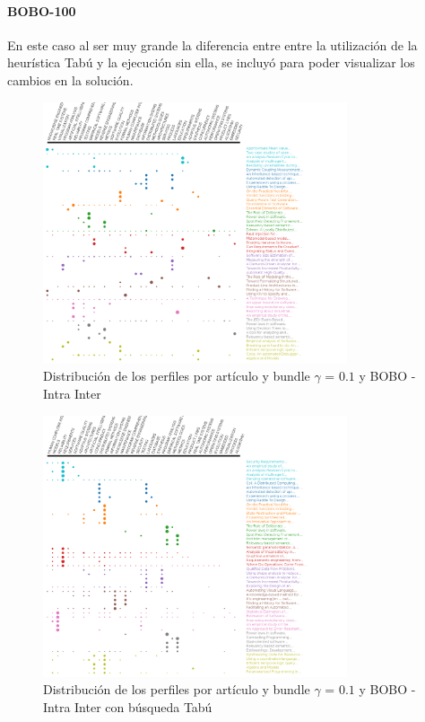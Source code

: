 \paragraph{BOBO-100}
En este caso al ser muy grande la diferencia entre entre la utilización de la heurística Tabú y la ejecución sin ella,  se incluyó para poder visualizar los cambios en la solución.
\begin{figure}[H]
  \centering
    \includegraphics[width=0.8\textwidth]{resultados/papers/BOBO/INTRA_INTER/gamma-01.png}
  \caption{Distribución de los perfiles por artículo y bundle $\gamma$ = $0.1$ y BOBO - Intra Inter}
  \label{res:img-papers-gamma01-bobo-intra-inter}
\end{figure}

\begin{figure}[H]
  \centering
    \includegraphics[width=0.8\textwidth]{resultados/papers/BOBO/INTRA_INTER/gamma-with-local-01.png}
  \caption{Distribución de los perfiles por artículo y bundle $\gamma$ = $0.1$ y BOBO - Intra Inter con búsqueda Tabú}
  \label{res:img-papers-gamma01-bobo-intra-inter-tabu}
\end{figure}

